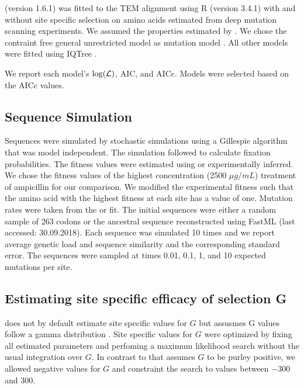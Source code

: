 \selac (version 1.6.1) was fitted to the TEM alignment using R (version 3.4.1) \citep{rcore} with and without site specific selection on amino acids estimated from deep mutation scanning experiments.
We assumed the \PC properties estimated by \citet{grantham1974}.
We chose the contraint free  general unrestricted model \citep{yang1994} as mutation model .
All other models were fitted using IQTree \citep{nguyen2015}.

We report each model's $\log(\mathcal{L})$, AIC, and  AICc. 
Models were selected based on the AICc values.

\subsection{Sequence Simulation}

Sequences were simulated by stochastic simulations using a Gillespie algorithm \citep{gillespie1976} that was model independent.
The simulation followed \citet{SellaAndHirsh2005} to calculate fixation probabilities.
The fitness values were estimated using \selac or experimentally inferred.
We chose the fitness values of the highest concentration (2500 $\mu g/mL$) treatment of ampicillin for our comparison.
We modified the experimental fitness such that the amino acid with the highest fitness at each site has a value of one.
Mutation rates were taken from the \selac or \selacDMS fit.
The initial sequences were either a random sample of 263 codons or the ancestral sequence reconstructed using FastML \citep{fastml} (last accessed: 30.09.2018).
Each sequence was simulated 10 times and we report average genetic load and sequence similarity and the corresponding standard error.
The sequences were sampled at times 0.01, 0.1, 1, and 10 expected mutations per site.

\subsection{Estimating site specific efficacy of selection G}

\selac does not by default estimate site specific values for $G$ but assusmes G values follow a gamma distribution \citep{Felsenstein2001}.
Site specific values for $G$ were optimized by fixing all estimated parameters and perfoming a maximum likelihood search without the usual integration over $G$.
In contrast to \selac that assumes $G$ to be purley positive, we allowed negative values for $G$ and constraint the search to values between $-300$ and $300$.

